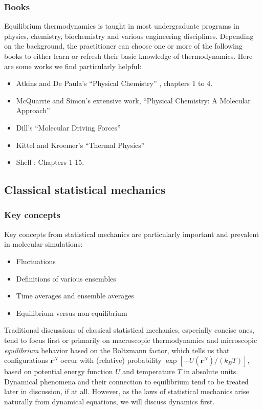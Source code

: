 \documentclass[9pt,bestpractices]{livecoms}
\newcommand{\conf}{\mathbf{r}^N}
\begin{document}
\subsubsection{Books}
Equilibrium thermodynamics is taught in most undergraduate programs in physics, chemistry, biochemistry and various engineering disciplines.
Depending on the background, the practitioner can choose one or more of the following books to either learn or refresh their basic knowledge of thermodynamics. 
Here are some works we find particularly helpful:
\begin{itemize}
\item Atkins and De Paula's ``Physical Chemistry'' \cite{AtkinsBook}, chapters 1 to 4.
\item McQuarrie and Simon's extensive work, ``Physical Chemistry: A Molecular Approach''~\cite{McQuarrie:1997:}
\item Dill's ``Molecular Driving Forces''~\cite{DillBook}
\item Kittel and Kroemer's ``Thermal Physics''~\cite{Kittel:1980:}
\item Shell \cite{ShellBook}: Chapters 1-15.
\end{itemize}


\subsection{Classical statistical mechanics}
\label{sec:stat_mech}
\subsubsection{Key concepts}
Key concepts from statistical mechanics are particularly important and prevalent in molecular simulations:
\begin{itemize}
\item Fluctuations
\item Definitions of various ensembles
\item Time averages and ensemble averages
\item Equilibrium versus non-equilibrium
\end{itemize}

Traditional discussions of classical statistical mechanics, especially concise ones, tend to focus first or primarily on macroscopic thermodynamics and microscopic \emph{equilibrium} behavior based on the Boltzmann factor, which tells us that configurations $\conf$ occur with (relative) probability $\exp[-U(\conf)/(k_B T)]$, based on potential energy function $U$ and temperature $T$ in absolute units.  
Dynamical phenomena and their connection to equilibrium tend to be treated later in discussion, if at all.
However, as the laws of statistical mechanics arise naturally from dynamical equations, we will discuss dynamics first.
\end{document}
